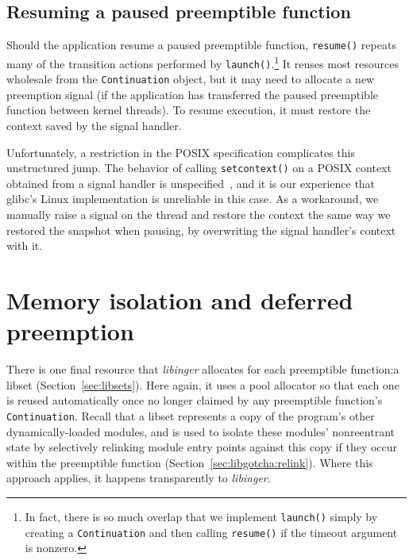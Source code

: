 \subsection{Resuming a paused preemptible function}
\label{sec:libinger:resuming}

Should the application resume a paused preemptible function, \texttt{resume()}
repeats many of the transition actions performed by \texttt{launch()}.\footnote{In
fact, there is so much overlap that we implement \texttt{launch()} simply by creating
a \texttt{Continuation} and then calling \texttt{resume()} if the timeout argument is
nonzero.}  It reuses most resources wholesale from the \texttt{Continuation} object,
but it may need to allocate a new preemption signal (if the application has
transferred the paused preemptible function between kernel threads).  To resume
execution, it must restore the context saved by the signal handler.

Unfortunately, a restriction in the POSIX specification complicates this unstructured
jump.  The behavior of calling \texttt{setcontext()} on a POSIX context obtained from
a signal handler is unspecified~\cite{getcontext-manpage}, and it is our experience
that glibc's Linux implementation is unreliable in this case.  As a workaround, we
manually raise a signal on the thread and restore the context the same way we
restored the snapshot when pausing, by overwriting the signal handler's context with
it.


\section{Memory isolation and deferred preemption}
\label{sec:libinger:isolation}

There is one final resource that \textit{libinger} allocates for each preemptible
function:\@ a libset (Section~\ref{sec:libsets}).  Here again, it uses a pool
allocator so that each one is reused automatically once no longer claimed by any
preemptible function's \texttt{Continuation}.  Recall that a libset represents a copy
of the program's other dynamically-loaded modules, and is used to isolate these
modules' nonreentrant state by selectively relinking module entry points against this
copy if they occur within the preemptible function
(Section~\ref{sec:libgotcha:relink}).  Where this approach applies, it happens
transparently to \textit{libinger}.

